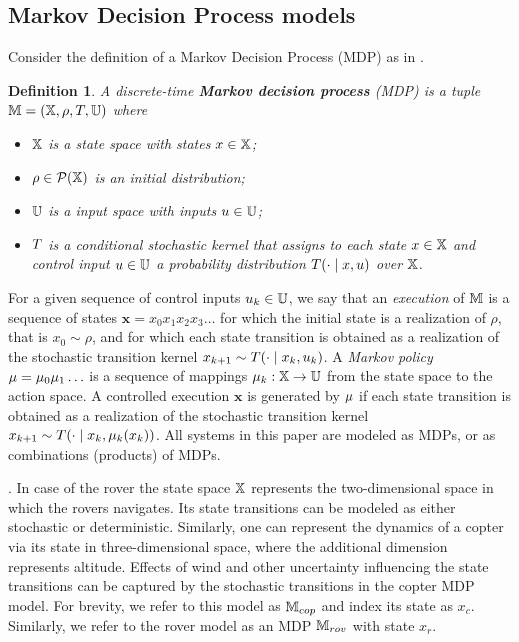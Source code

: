 \documentclass[conference]{IEEEtran}
\renewcommand{\cite}[1]{\citep{#1}}
\newtheorem{definition}{Definition}
\begin{document}
\subsection{Markov Decision Process models}
Consider the definition of a Markov Decision Process (MDP) as in \cite{Bertsekas1978}.
\begin{definition}
\label{def:MDP}
  A discrete-time \textbf{Markov decision process} (MDP) is a tuple $\mathbb{M} = (\mathbb{X}, \rho, T, \mathbb{U})$ where
  \begin{itemize}
    \item $\mathbb{X}$ is a state space with states $x\in\mathbb{X}$; %
    \item $\rho \in \mathcal P (\mathbb{X})$ is an initial distribution;
    \item $\mathbb{U}$ is a input space with inputs $u\in\mathbb{U}$;
    \item $T$ is a conditional stochastic kernel that assigns to each state $x\in \mathbb{X}$ and control input $u\in \mathbb{U}$ a probability distribution $T(\cdot\mid x,u)$ over $\mathbb{X}$.
  \end{itemize}
\end{definition}
For a given sequence of control inputs $u_k \in \mathbb{U}$, we say that an \emph{execution} of $\mathbb{M}$ is a sequence of states $\mathbf x = x_0x_1x_2x_3\ldots $ for which the initial state is a realization of $\rho$, that is $x_0 \sim \rho$, and for which each state transition is obtained as a realization of the stochastic transition kernel $x_{k+1} \sim T(\cdot \mid x_k, u_k)$. A \emph{Markov policy} $\mu = \mu_0 \mu_1 \ldots$ is a sequence of mappings $\mu_k:\mathbb{X}\rightarrow \mathbb{U}$ from the state space to the action space. A controlled execution $\mathbf x$ is generated by $\mu$ if each state transition is obtained as a realization of the stochastic transition kernel $x_{k+1} \sim T(\cdot \mid x_k, \mu_k(x_k))$. All systems in this paper are modeled as MDPs, or as combinations (products) of MDPs.

\smallskip 
{}.
In case of the rover the state space $\mathbb{X}$ represents the two-dimensional space in which the rovers navigates. Its state transitions can be modeled as either stochastic or deterministic. Similarly, one can represent the dynamics of a copter via its state in three-dimensional space, where the additional dimension represents altitude. Effects of wind and other uncertainty influencing the state transitions can be captured by the stochastic transitions in the copter MDP model. For brevity, we refer to this model as $\mathbb{M}_{cop}$ and index its state as $x_c$. Similarly, we refer to the rover model as an MDP $\mathbb{M}_{rov}$ with state $x_r$.
\end{document}
